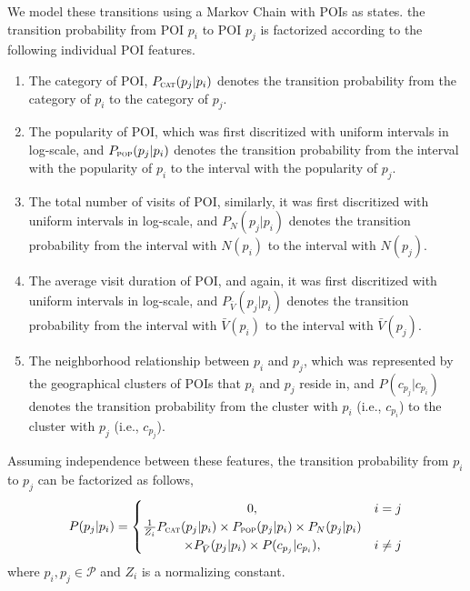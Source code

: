 We model these transitions using a Markov Chain with POIs as states.
the transition probability from POI $p_i$ to POI $p_j$ is factorized according to
the following individual POI features.
\begin{enumerate}
\item The category of POI, $P_{\textsc{cat}}(p_j | p_i)$
      denotes the transition probability from the category of $p_i$ to the category of $p_j$.
\item The popularity of POI, which was first discritized with uniform intervals in log-scale,
      and $P_{\textsc{pop}}(p_j | p_i)$ denotes the transition probability from the interval with the popularity of
      $p_i$ to the interval with the popularity of $p_j$.
\item The total number of visits of POI, similarly, it was first discritized with uniform intervals in log-scale,
      and $P_N(p_j | p_i)$ denotes the transition probability from the interval with $N(p_i)$
      to the interval with $N(p_j)$.
\item The average visit duration of POI, and again, it was first discritized with uniform intervals in log-scale,
      and $P_{\bar{V}}(p_j | p_i)$ denotes the transition probability from the interval with $\bar{V}(p_i)$
      to the interval with $\bar{V}(p_j)$.
\item The neighborhood relationship between $p_i$ and $p_j$,
      which was represented by the geographical clusters of POIs that $p_i$ and $p_j$ reside in,
      and $P(c_{p_j} | c_{p_i})$ denotes the transition probability from the cluster with
      $p_i$ (i.e., $c_{p_i}$) to the cluster with $p_j$ (i.e., $c_{p_j}$).
\end{enumerate}

Assuming independence between these features,
the transition probability from $p_i$ to $p_j$ can be factorized as follows,
\begin{displaymath}
    P(p_j | p_i) =
    \begin{cases}
    \hfill 0, \hfill & i = j \\
    \hfill \frac{1}{Z_i} P_{\textsc{cat}}(p_j | p_i) \times P_{\textsc{pop}}(p_j | p_i) \times P_N(p_j | p_i) \\
    \hfill \times P_{\bar{V}}(p_j | p_i) \times P(c_{p_j} | c_{p_i}), \hfill & i \ne j
    \end{cases}
\end{displaymath}
where $p_i, p_j \in \mathcal{P}$ and $Z_i$ is a normalizing constant.

